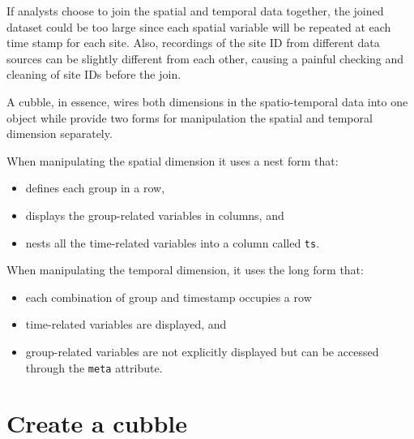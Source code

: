 \documentclass{article}
\newenvironment{Shaded}{\begin{snugshade}}{\end{snugshade}}
\newcommand{\FunctionTok}[1]{\textcolor[rgb]{0.00,0.00,0.00}{#1}}
\newcommand{\NormalTok}[1]{#1}
\newcommand{\OtherTok}[1]{\textcolor[rgb]{0.56,0.35,0.01}{#1}}
\newcommand{\SpecialCharTok}[1]{\textcolor[rgb]{0.00,0.00,0.00}{#1}}
\begin{document}
\begin{Shaded}
\end{Shaded}

If analysts choose to join the spatial and temporal data together, the
joined dataset could be too large since each spatial variable will be
repeated at each time stamp for each site. Also, recordings of the site
ID from different data sources can be slightly different from each
other, causing a painful checking and cleaning of site IDs before the
join.

A cubble, in essence, wires both dimensions in the spatio-temporal data
into one object while provide two forms for manipulation the spatial and
temporal dimension separately.

When manipulating the spatial dimension it uses a nest form that:

\begin{itemize}
\tightlist
\item
  defines each group in a row,
\item
  displays the group-related variables in columns, and
\item
  nests all the time-related variables into a column called \texttt{ts}.
\end{itemize}

When manipulating the temporal dimension, it uses the long form that:

\begin{itemize}
\tightlist
\item
  each combination of group and timestamp occupies a row
\item
  time-related variables are displayed, and
\item
  group-related variables are not explicitly displayed but can be
  accessed through the \texttt{meta} attribute.
\end{itemize}

\newpage

\hypertarget{create-a-cubble}{%
\section{Create a cubble}\label{create-a-cubble}}
\end{document}
